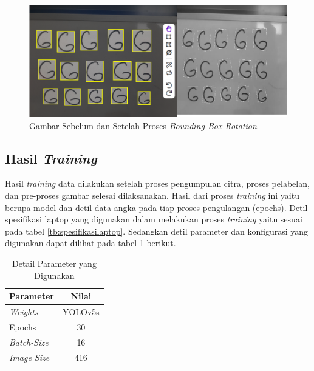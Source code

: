 \begin{figure}[H]
  \centering
  \includegraphics[scale=0.32]{gambar/bbrotation.png}
  \caption{Gambar Sebelum dan Setelah Proses \textit{Bounding Box Rotation}}
  \label{fig:bbrotation}
\end{figure}

\subsection{Hasil \textit{Training}}
\label{subsec:Hasiltraining}

Hasil \textit{training} data dilakukan setelah proses pengumpulan citra, proses pelabelan, dan pre-proses gambar selesai dilaksanakan. Hasil dari proses \textit{training} ini yaitu berupa model dan detil data angka pada tiap proses pengulangan  (epochs). Detil spesifikasi laptop yang digunakan dalam melakukan proses \textit{training} yaitu sesuai pada tabel \ref{tb:spesifikasilaptop}. Sedangkan detil parameter dan konfigurasi yang digunakan dapat dilihat pada tabel \ref*{tb:parametertrain} berikut. \par 

\begin{table}[H]
  \begin{center}
      \begin{tabular}{|l|c|}
      \hline
      \multicolumn{1}{|c|}{\textbf{Parameter}} & \textbf{Nilai} \\ \hline
      \textit{Weights}                         & YOLOv5s                 \\ \hline
      Epochs                                   & 30                      \\ \hline
      \textit{Batch-Size}                      & 16                      \\ \hline
      \textit{Image Size}                      & 416                     \\ \hline
      \end{tabular}
  \end{center}
  \caption{Detail Parameter yang Digunakan}
  \label{tb:parametertrain}
  \end{table}

